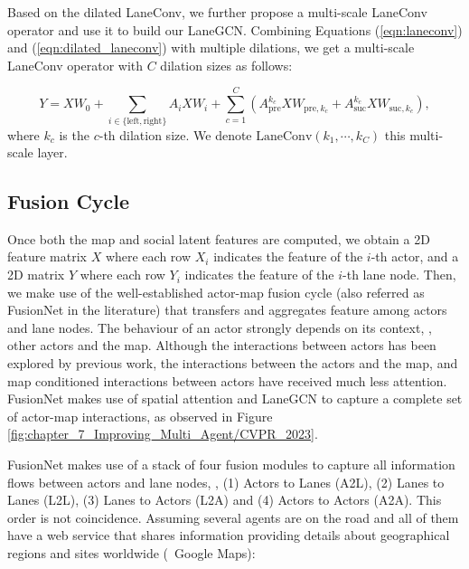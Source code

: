Based on the dilated LaneConv, we further propose a multi-scale LaneConv operator and use it to build our LaneGCN. Combining Equations (\ref{eqn:laneconv}) and (\ref{eqn:dilated_laneconv}) with multiple dilations, we get a multi-scale LaneConv operator with $C$ dilation sizes as follows:

\begin{equation}\label{eqn:dilated_laneconv_final}
	Y = XW_0 + \sum_{i \in \{ \text{left}, \text{right} \}} {A_{i} X W_{i}}
	+ \sum_{c=1}^{C} {\left( A_{\text{pre}}^{k_{c}} X W_{\text{pre},k_{c}} + A_{\text{suc}}^{k_{c}} X W_{\text{suc},k_{c}} \right)},
\end{equation}
where $k_c$ is the $c$-th dilation size. We denote  $\text{LaneConv}(k_1, \cdots, k_C)$ this multi-scale layer. 

\subsection{Fusion Cycle}
\label{subsubsec:4_improving_efficiency_fusion_cycle}

Once both the map and social latent features are computed, we obtain a 2D feature matrix $X$ where each row $X_i$ indicates the feature of the $i$-th actor, and a 2D matrix $Y$ where each row $Y_i$ indicates the feature of the $i$-th lane node. Then, we make use of the well-established actor-map fusion cycle \cite{liang2020learning} (also referred as FusionNet in the literature) that transfers and aggregates feature among actors and lane nodes. The behaviour of an actor strongly depends on its context, \ie, other actors and the map. Although the interactions between actors has been explored by previous work, the interactions between the actors and the map, and map conditioned interactions between actors have received much less attention. FusionNet makes use of spatial attention and LaneGCN to capture a complete set of actor-map interactions, as observed in Figure \ref{fig:chapter_7_Improving_Multi_Agent/CVPR_2023}.

FusionNet makes use of a stack of four fusion modules to capture all information flows between actors and lane nodes, \ie, (1) Actors to Lanes (A2L), (2) Lanes to Lanes (L2L), (3) Lanes to Actors (L2A) and (4) Actors to Actors (A2A). This order is not coincidence. Assuming several agents are on the road and all of them have a web service that shares information providing details about geographical regions and sites worldwide (\eg \ Google Maps):

